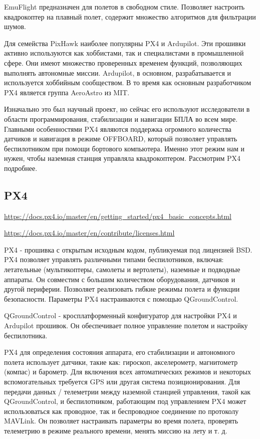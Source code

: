 EmuFlight предназначен для полетов в свободном стиле. Позволяет настроить квадрокоптер на плавный полет, содержит множество алгоритмов для фильтрации шумов.

Для семейства PixHawk наиболее популярны PX4 и Ardupilot. Эти прошивки активно используются как хоббистами, так и специалистами в промышленной сфере. Они имеют множество проверенных временем функций, позволяющих выполнять автономные миссии. Ardupilot, в основном, разрабатывается и используется хоббийным сообществом. В то время как основным разработчиком PX4 является группа AeroAstro из MIT.

Изначально это был научный проект, но сейчас его используют исследователи в области программирования, стабилизации и навигации БПЛА во всем мире. Главными особенностями PX4 являются поддержка огромного количества датчиков и навигация в режиме OFFBOARD, который позволяет управлять беспилотником при помощи бортового компьютера. Именно этот режим нам и нужен, чтобы наземная станция управляла квадрокоптером. Рассмотрим PX4 подробнее.

\subsection{PX4}
\url{https://docs.px4.io/master/en/getting_started/px4_basic_concepts.html}

\url{https://docs.px4.io/master/en/contribute/licenses.html}

PX4 - прошивка с открытым исходным кодом, публикуемая под лицензией BSD. PX4 позволяет управлять различными типами беспилотников, включая: летательные (мультикоптеры, самолеты и вертолеты), наземные и подводные аппараты. Он совместим с большим количеством оборудования, датчиков и другой периферии. Позволяет реализовать гибкие режимы полета и функции безопасности.
Параметры PX4 настраиваются с помощью QGroundControl.\cite{px4}

QGroundControl - кросплатформенный конфигуратор для настройки PX4 и Ardupilot прошивок. Он обеспечивает полное управление полетом и настройку беспилотника. \cite{qgroundcontrol}

PX4 для определения состояния аппарата, его стабилизации и автономного полета использует датчики, такие как: гироскоп, акселерометр, магнитометр (компас) и барометр. Для включения всех автоматических режимов и некоторых вспомогательных требуется GPS или другая система позиционирования.
Для передачи данных / телеметрии между наземной станцией управления, такой как QGroundControl, и беспилотником, работающим под управлением PX4 может использоваться как проводное, так и беспроводное соединение по протоколу MAVLink. Он позволяет настраивать параметры во время полета, проверять телеметрию в режиме реального времени, менять миссию на лету и т. д.

